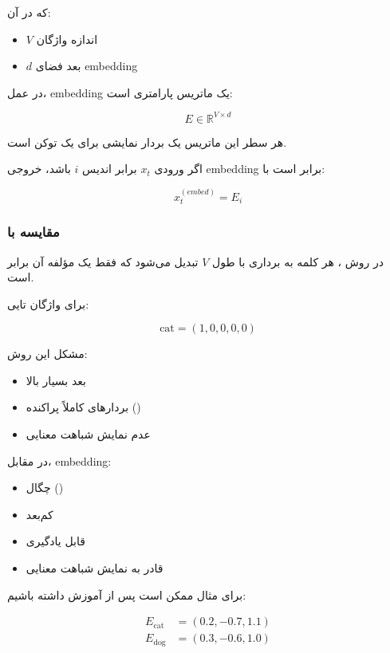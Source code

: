 \documentclass{article}
\begin{document}
که در آن:

\begin{itemize}
	\item \(V\) اندازه واژگان
	\item \(d\) بعد فضای embedding
\end{itemize}

در عمل، embedding یک ماتریس پارامتری است:

\begin{equation}
	E \in \mathbb{R}^{V \times d}
\end{equation}

هر سطر این ماتریس یک بردار نمایشی برای یک توکن است.

اگر ورودی \(x_t\) برابر اندیس \(i\) باشد، خروجی embedding برابر است با:

\begin{equation}
	x_t^{(embed)} = E_{i}
\end{equation}

\subsubsection{مقایسه با }

در روش ، هر کلمه به برداری با طول \(V\) تبدیل می‌شود که فقط یک مؤلفه آن برابر  است.

برای واژگان  تایی:

\begin{equation}
	\text{cat} = (1,0,0,0,0)
\end{equation}

مشکل این روش:

\begin{itemize}
	\item بعد بسیار بالا
	\item بردارهای کاملاً پراکنده ()
	\item عدم نمایش شباهت معنایی
\end{itemize}

در مقابل، embedding:

\begin{itemize}
	\item چگال ()
	\item کم‌بعد
	\item قابل یادگیری
	\item قادر به نمایش شباهت معنایی
\end{itemize}

برای مثال ممکن است پس از آموزش داشته باشیم:

\begin{align}
	E_{\text{cat}} &= (0.2, -0.7, 1.1) \\
	E_{\text{dog}} &= (0.3, -0.6, 1.0)
\end{align}
\end{document}
